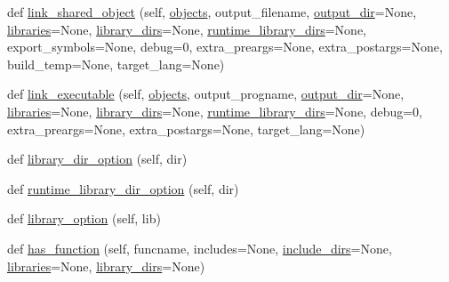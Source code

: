 \begin{DoxyCompactItemize}
def \hyperlink{classsetuptools_1_1__distutils_1_1ccompiler_1_1CCompiler_a477f6179a873bd6199a7f6c6114f94c6}{link\+\_\+shared\+\_\+object} (self, \hyperlink{classsetuptools_1_1__distutils_1_1ccompiler_1_1CCompiler_a05be10db9784635e8180cb8b97ec2e24}{objects}, output\+\_\+filename, \hyperlink{classsetuptools_1_1__distutils_1_1ccompiler_1_1CCompiler_a198fe320cb6d04ee5cf737d11e78a3d4}{output\+\_\+dir}=None, \hyperlink{classsetuptools_1_1__distutils_1_1ccompiler_1_1CCompiler_a5d525dbb7c7b0089ceecd9923d92c5a9}{libraries}=None, \hyperlink{classsetuptools_1_1__distutils_1_1ccompiler_1_1CCompiler_abcd7027cb0fdf82e357f0a75363b3ea4}{library\+\_\+dirs}=None, \hyperlink{classsetuptools_1_1__distutils_1_1ccompiler_1_1CCompiler_ac2fb5ab4e3fa3798f21c05c4aeea8508}{runtime\+\_\+library\+\_\+dirs}=None, export\+\_\+symbols=None, debug=0, extra\+\_\+preargs=None, extra\+\_\+postargs=None, build\+\_\+temp=None, target\+\_\+lang=None)
\item 
def \hyperlink{classsetuptools_1_1__distutils_1_1ccompiler_1_1CCompiler_a25e501b1067f2710492dfba285ce363f}{link\+\_\+executable} (self, \hyperlink{classsetuptools_1_1__distutils_1_1ccompiler_1_1CCompiler_a05be10db9784635e8180cb8b97ec2e24}{objects}, output\+\_\+progname, \hyperlink{classsetuptools_1_1__distutils_1_1ccompiler_1_1CCompiler_a198fe320cb6d04ee5cf737d11e78a3d4}{output\+\_\+dir}=None, \hyperlink{classsetuptools_1_1__distutils_1_1ccompiler_1_1CCompiler_a5d525dbb7c7b0089ceecd9923d92c5a9}{libraries}=None, \hyperlink{classsetuptools_1_1__distutils_1_1ccompiler_1_1CCompiler_abcd7027cb0fdf82e357f0a75363b3ea4}{library\+\_\+dirs}=None, \hyperlink{classsetuptools_1_1__distutils_1_1ccompiler_1_1CCompiler_ac2fb5ab4e3fa3798f21c05c4aeea8508}{runtime\+\_\+library\+\_\+dirs}=None, debug=0, extra\+\_\+preargs=None, extra\+\_\+postargs=None, target\+\_\+lang=None)
\item 
def \hyperlink{classsetuptools_1_1__distutils_1_1ccompiler_1_1CCompiler_a3f4e9315193723a24eb4d021d3cda16e}{library\+\_\+dir\+\_\+option} (self, dir)
\item 
def \hyperlink{classsetuptools_1_1__distutils_1_1ccompiler_1_1CCompiler_ab916355b3dd0f8723913927bdf79a882}{runtime\+\_\+library\+\_\+dir\+\_\+option} (self, dir)
\item 
def \hyperlink{classsetuptools_1_1__distutils_1_1ccompiler_1_1CCompiler_ab9298b3dd72a504a7f15eef1f512ea74}{library\+\_\+option} (self, lib)
\item 
def \hyperlink{classsetuptools_1_1__distutils_1_1ccompiler_1_1CCompiler_a94a854b26006d2d55d8ec11c6997a636}{has\+\_\+function} (self, funcname, includes=None, \hyperlink{classsetuptools_1_1__distutils_1_1ccompiler_1_1CCompiler_a0886798eca57d9ffa09c058a598c7465}{include\+\_\+dirs}=None, \hyperlink{classsetuptools_1_1__distutils_1_1ccompiler_1_1CCompiler_a5d525dbb7c7b0089ceecd9923d92c5a9}{libraries}=None, \hyperlink{classsetuptools_1_1__distutils_1_1ccompiler_1_1CCompiler_abcd7027cb0fdf82e357f0a75363b3ea4}{library\+\_\+dirs}=None)

\end{DoxyCompactItemize}
